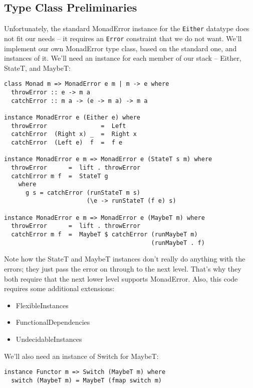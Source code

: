 \documentclass{tmr}
\begin{document}
\subsection{Type Class Preliminaries}
Unfortunately, the standard MonadError instance for the \verb+Either+ datatype does
not fit our needs -- it requires an \verb+Error+ constraint that we do not want.
We'll implement our own MonadError type class, based on the
standard one, and instances of it.  We'll need an instance for each member of
our stack -- Either, StateT, and MaybeT: 
\begin{verbatim}
class Monad m => MonadError e m | m -> e where
  throwError :: e -> m a
  catchError :: m a -> (e -> m a) -> m a

instance MonadError e (Either e) where
  throwError               =  Left
  catchError  (Right x) _  =  Right x
  catchError  (Left e)  f  =  f e
  
instance MonadError e m => MonadError e (StateT s m) where
  throwError      =  lift . throwError
  catchError m f  =  StateT g
    where
      g s = catchError (runStateT m s) 
                       (\e -> runStateT (f e) s)

instance MonadError e m => MonadError e (MaybeT m) where
  throwError      =  lift . throwError
  catchError m f  =  MaybeT $ catchError (runMaybeT m) 
                                         (runMaybeT . f)
\end{verbatim}
Note how the StateT and MaybeT instances don't really do anything with the
errors; they just pass the error on through to the next level.  That's why they
both require that the next lower level supports MonadError.  Also, this code 
requires some additional extensions:
\begin{itemize}
  \item FlexibleInstances
  \item FunctionalDependencies
  \item UndecidableInstances 
\end{itemize}

We'll also need an instance of Switch for MaybeT:
\begin{verbatim}
instance Functor m => Switch (MaybeT m) where
  switch (MaybeT m) = MaybeT (fmap switch m)
\end{verbatim}
\end{document}
